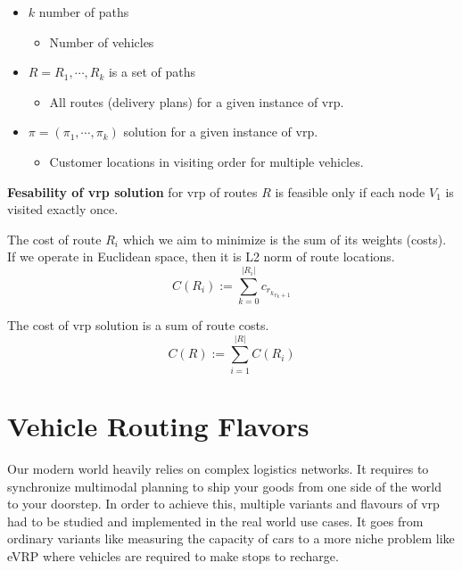 \begin{itemize}
\begin{itemize}
        \end{itemize}
        \item $k$ number of paths
        \begin{itemize}
            \item Number of vehicles
        \end{itemize}
        \item $R = R_1, \cdots, R_k$ is a set of paths
        \begin{itemize}
            \item All routes (delivery plans) for a given instance of \gls{vrp}.
        \end{itemize}
        \item $\pi = (\pi_1, \cdots, \pi_k)$ solution for a given instance of \gls{vrp}.
        \begin{itemize}
            \item Customer locations in visiting order for multiple vehicles.
        \end{itemize}
    \end{itemize}
    
    \textbf{Fesability of \gls{vrp} solution} for \gls{vrp} of routes $R$ is feasible only if each node $V_1$ is visited exactly once.
    
    The cost of route $R_i$ which we aim to minimize is the sum of its weights (costs). If we operate in Euclidean space, then it is L2 norm of route locations.
    \begin{equation}
        C(R_i) := \sum_{k = 0}^{|R_i|} c_{r_k}_{r_k+1}
    \end{equation}
    
    The cost of \gls{vrp} solution is a sum of route costs.
    \begin{equation}
        C(R) := \sum_{i = 1}^{|R|} C(R_i)
    \end{equation}
    
\section{Vehicle Routing Flavors}
Our modern world heavily relies on complex logistics networks. It requires to synchronize multimodal planning to ship your goods from one side of the world to your doorstep. In order to achieve this, multiple variants and flavours of \gls{vrp} had to be studied and implemented in the real world use cases. It goes from ordinary variants like measuring the capacity of cars to a more niche problem like eVRP where vehicles are required to make stops to recharge.

